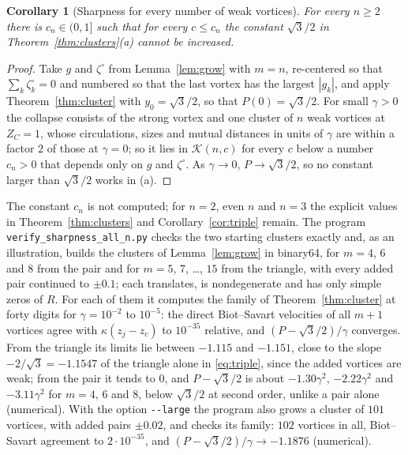 \documentclass[11pt]{article}
\newtheorem{corollary}{Corollary}
\theoremstyle{definition}
\newcommand{\K}{\mathcal{K}}
\begin{document}
\begin{corollary}[Sharpness for every number of weak vortices]\label{cor:alln}
For every $n \ge 2$ there is $c_n \in (0, 1]$ such that for every $c \le c_n$ the constant $\sqrt{3}/2$ in Theorem~\ref{thm:clusters}\textup{(a)} cannot be increased.
\end{corollary}

\begin{proof}
Take $g$ and $\zeta^\circ$ from Lemma~\ref{lem:grow} with $m = n$, re-centered so that $\sum_k\zeta^\circ_k = 0$ and numbered so that the last vortex has the largest $|g_k|$, and apply Theorem~\ref{thm:cluster} with $y_0 = \sqrt{3}/2$, so that $P(0) = \sqrt{3}/2$. For small $\gamma > 0$ the collapse consists of the strong vortex and one cluster of $n$ weak vortices at $Z_C = 1$, whose circulations, sizes and mutual distances in units of $\gamma$ are within a factor $2$ of those at $\gamma = 0$; so it lies in $\K(n, c)$ for every $c$ below a number $c_n > 0$ that depends only on $g$ and $\zeta^\circ$. As $\gamma \to 0$, $P \to \sqrt{3}/2$, so no constant larger than $\sqrt{3}/2$ works in (a).
\end{proof}

The constant $c_n$ is not computed; for $n = 2$, even $n$ and $n = 3$ the explicit values in Theorem~\ref{thm:clusters} and Corollary~\ref{cor:triple} remain. The program \texttt{verify\_\allowbreak sharpness\_\allowbreak all\_\allowbreak n.py} checks the two starting clusters exactly and, as an illustration, builds the clusters of Lemma~\ref{lem:grow} in binary64, for $m = 4$, $6$ and $8$ from the pair and for $m = 5$, $7$, \ldots, $15$ from the triangle, with every added pair continued to $\pm0.1$; each translates, is nondegenerate and has only simple zeros of $R$. For each of them it computes the family of Theorem~\ref{thm:cluster} at forty digits for $\gamma = 10^{-2}$ to $10^{-5}$: the direct Biot--Savart velocities of all $m + 1$ vortices agree with $\kappa(z_j - z_c)$ to $10^{-35}$ relative, and $(P - \sqrt{3}/2)/\gamma$ converges. From the triangle its limits lie between $-1.115$ and $-1.151$, close to the slope $-2/\sqrt{3} = -1.1547$ of the triangle alone in \eqref{eq:triple}, since the added vortices are weak; from the pair it tends to $0$, and $P - \sqrt{3}/2$ is about $-1.30\gamma^2$, $-2.22\gamma^2$ and $-3.11\gamma^2$ for $m = 4$, $6$ and $8$, below $\sqrt{3}/2$ at second order, unlike a pair alone \cite[Proposition~4]{mw2026} (numerical). With the option \texttt{-{}-large} the program also grows a cluster of $101$ vortices, with added pairs $\pm0.02$, and checks its family: $102$ vortices in all, Biot--Savart agreement to $2 \cdot 10^{-35}$, and $(P - \sqrt{3}/2)/\gamma \to -1.1876$ (numerical).
\end{document}
